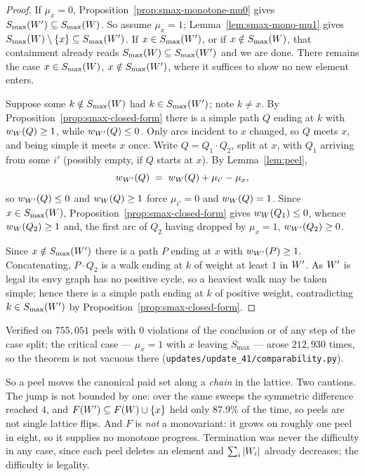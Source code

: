 \begin{proof}
If $\mu_x = 0$, Proposition~\ref{prop:smax-monotone-mu0} gives
$S_{\max}(W') \subseteq S_{\max}(W)$. So assume
$\mu_x = 1$; Lemma~\ref{lem:smax-mono-mu1} gives $S_{\max}(W)
\setminus \left\{x\right\} \subseteq S_{\max}(W')$. If $x \in
S_{\max}(W')$, or if $x \notin S_{\max}(W)$, that
containment already reads $S_{\max}(W) \subseteq
S_{\max}(W')$ and we are done. There remains the case
$x \in S_{\max}(W)$, $x \notin S_{\max}(W')$, where it
suffices to show no new element enters.

Suppose some $k \notin S_{\max}(W)$ had $k \in
S_{\max}(W')$; note $k \ne x$. By
Proposition~\ref{prop:smax-closed-form} there is a simple path $Q$ ending at $k$
with $w_{W}(Q) \ge 1$, while $w_{W'}(Q) \le 0$.
Only arcs incident to $x$ changed, so $Q$ meets $x$, and being simple it meets
$x$ once. Write $Q = Q_1 \cdot Q_2$, split at $x$, with $Q_1$ arriving from some
$i'$ (possibly empty, if $Q$ starts at $x$). By Lemma~\ref{lem:peel},
\[
  w_{W'}(Q) \;=\; w_{W}(Q) + \mu_{i'} - \mu_x ,
\]
so $w_{W'}(Q) \le 0$ and $w_{W}(Q) \ge 1$ force
$\mu_{i'} = 0$ and $w_{W}(Q) = 1$. Since $x \in
S_{\max}(W)$, Proposition~\ref{prop:smax-closed-form} gives
$w_{W}(Q_1) \le 0$, whence $w_{W}(Q_2) \ge 1$ and,
the first arc of $Q_2$ having dropped by $\mu_x = 1$,
$w_{W'}(Q_2) \ge 0$.

Since $x \notin S_{\max}(W')$ there is a path $P$ ending at $x$ with
$w_{W'}(P) \ge 1$. Concatenating, $P \cdot Q_2$ is a walk ending at
$k$ of weight at least $1$ in $W'$. As $W'$ is legal its
envy graph has no positive cycle, so a heaviest walk may be taken simple; hence
there is a simple path ending at $k$ of positive weight, contradicting
$k \in S_{\max}(W')$ by
Proposition~\ref{prop:smax-closed-form}.
\end{proof}

Verified on $755{,}051$ peels with $0$ violations of the conclusion or of any
step of the case split; the critical case --- $\mu_x = 1$ with $x$ leaving
$S_{\max}$ --- arose $212{,}930$ times, so the theorem is not vacuous there
(\texttt{updates/update\_41/comparability.py}).

So a peel moves the canonical paid set along a \emph{chain} in the lattice.
Two cautions. The jump is not bounded by one: over the same sweeps the symmetric
difference reached $4$, and $F(W') \subseteq F(W) \cup
\left\{x\right\}$ held only $87.9\%$ of the time, so peels are not single lattice flips.
And $F$ is \emph{not} a monovariant: it grows on roughly one peel in eight, so it
supplies no monotone progress. Termination was never the difficulty in any case,
since each peel deletes an element and $\sum_i \left\lvert W_i\right\rvert$ already
decreases; the difficulty is legality.

